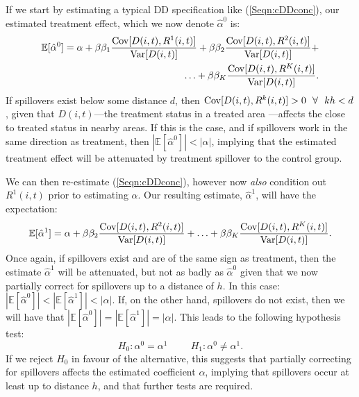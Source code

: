 If we start by estimating a typical DD specification like (\ref{Seqn:cDDconc}),
our estimated treatment effect, which we now denote $\hat\alpha^0$ is:
\begin{equation}
\nonumber
\begin{split}
\mathbb{E}[\hat\alpha^0]=\alpha + \beta\beta_1\frac{\mathrm{Cov}[D(i,t),R^1(i,t)]}{\mathrm{Var}[D(i,t)]}
                                + \beta\beta_2\frac{\mathrm{Cov}[D(i,t),R^2(i,t)]}{\mathrm{Var}[D(i,t)]}
                                + \\ \ldots
                                + \beta\beta_K\frac{\mathrm{Cov}[D(i,t),R^K(i,t)]}{\mathrm{Var}[D(i,t)]}.
\end{split}
\end{equation}
If spillovers exist below some distance $d$, then $\Cov[D(i,t),R^k(i,t)]>0 \ \ 
\forall \ \ kh<d$, given that $D(i,t)$---the treatment status in a treated area%
---affects the close to treated status in nearby areas. If this is the case, and 
if spillovers work in the same direction as treatment, then 
$|\mathbb{E}[\hat\alpha^0]|<|\alpha|$, implying that the estimated treatment 
effect will be attenuated by treatment spillover to the control group.  

We can then re-estimate (\ref{Seqn:cDDconc}), however now \emph{also} condition
out $R^1(i,t)$ prior to estimating $\alpha$.  Our resulting estimate, 
$\hat\alpha^1$, will have the expectation:
\begin{equation}
\nonumber
\begin{split}
\mathbb{E}[\hat\alpha^1]=\alpha + \beta\beta_2\frac{\mathrm{Cov}[D(i,t),R^2(i,t)]}{\mathrm{Var}[D(i,t)]}
                                + \ldots
                                + \beta\beta_K\frac{\mathrm{Cov}[D(i,t),R^K(i,t)]}{\mathrm{Var}[D(i,t)]}.
\end{split}
\end{equation}
Once again, if spillovers exist and are of the same sign as treatment, then the
estimate $\hat\alpha^1$ will be attenuated, but not as badly as $\hat\alpha^0$ 
given that we now partially correct for spillovers up to a distance of $h$.  In 
this case: $|\mathbb{E}[\hat\alpha^0]|<|\mathbb{E}[\hat\alpha^1]|<|\alpha|$.  If, 
on the other hand, spillovers do not exist, then we will have that 
$|\mathbb{E}[\hat\alpha^0]|=|\mathbb{E}[\hat\alpha^1]|=|\alpha|$.  This leads to 
the following hypothesis test:
\[
H_0: \alpha^0=\alpha^1 \hspace{1cm}
H_1: \alpha^0\neq\alpha^1.
\]
If we reject $H_0$ in favour of the alternative, this suggests that partially 
correcting for spillovers affects the estimated coefficient $\alpha$, implying that
spillovers occur at least up to distance $h$, and that further tests are required.  


